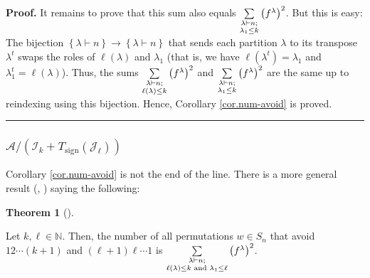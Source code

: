 \documentclass[numbers=enddot,12pt,final,onecolumn,notitlepage]{scrartcl}%
\numberwithin{exer}{subsection}
\theoremstyle{definition}
\newtheorem{theo}{Theorem}[subsection]
\newenvironment{theorem}[1][]
{\begin{theo}[#1]\begin{leftbar}}
{\end{leftbar}\end{theo}}
\newenvironment{proof}[1][Proof]{\noindent\textbf{#1.} }{\ \rule{0.5em}{0.5em}}
\let\sumnonlimits\sum
\renewcommand{\sum}{\sumnonlimits\limits}
\begin{document}
\begin{proof}
It remains to prove that this sum also equals $\sum\limits_{\substack{\lambda
\vdash n;\\\lambda_{1}\leq k}}\left(  f^{\lambda}\right)  ^{2}$. But this is
easy: The bijection $\left\{  \lambda\vdash n\right\}  \rightarrow\left\{
\lambda\vdash n\right\}  $ that sends each partition $\lambda$ to its
transpose $\lambda^{t}$ swaps the roles of $\ell\left(  \lambda\right)  $ and
$\lambda_{1}$ (that is, we have $\ell\left(  \lambda^{t}\right)  =\lambda_{1}$
and $\lambda_{1}^{t}=\ell\left(  \lambda\right)  $). Thus, the sums
$\sum\limits_{\substack{\lambda\vdash n;\\\ell\left(  \lambda\right)  \leq
k}}\left(  f^{\lambda}\right)  ^{2}$ and $\sum\limits_{\substack{\lambda\vdash
n;\\\lambda_{1}\leq k}}\left(  f^{\lambda}\right)  ^{2}$ are the same up to
reindexing using this bijection. Hence, Corollary \ref{cor.num-avoid} is proved.
\end{proof}

\subsubsection{$\mathcal{A}/\left(  \mathcal{I}_{k}+T_{\operatorname*{sign}%
}\left(  \mathcal{J}_{\ell}\right)  \right)  $}

Corollary \ref{cor.num-avoid} is not the end of the line. There is a more
general result (\cite[Theorem 3]{Schens60}, \cite[Proposition 17.5]{Stanle71})
saying the following:

\begin{theorem}
\label{thm.num-avoid2}Let $k,\ell\in\mathbb{N}$. Then, the number of all
permutations $w\in S_{n}$ that avoid $12\cdots\left(  k+1\right)  $ and
$\left(  \ell+1\right)  \ell\cdots1$ is $\sum\limits_{\substack{\lambda\vdash
n;\\\ell\left(  \lambda\right)  \leq k\text{ and }\lambda_{1}\leq\ell}}\left(
f^{\lambda}\right)  ^{2}$.
\end{theorem}
\end{document}
